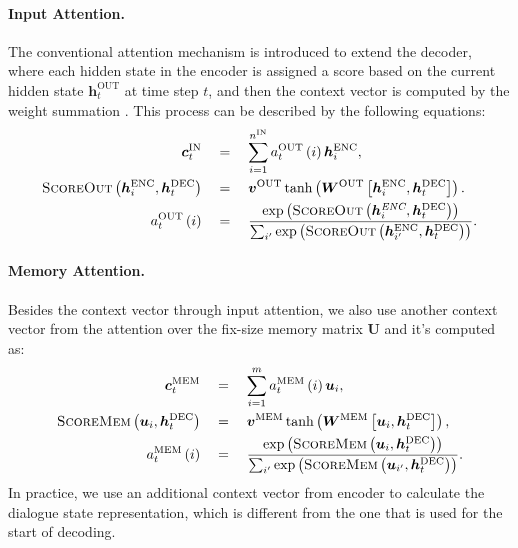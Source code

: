 \documentclass[11pt]{article}
\begin{document}
\paragraph{Input Attention.}
The conventional attention mechanism is introduced to extend the decoder, where each hidden state in the encoder is assigned a score based on the current hidden state $\boldsymbol h^{\text{OUT}}_t$ at time step $t$, and then the context vector is computed by the weight summation \cite{luong-pham-manning:2015:EMNLP}. This process can be described by the following equations:
\begin{align*}
\boldsymbol{c}^{\text{IN}}_t\quad &=\quad \sum_{i=1}^{n^{\text{IN}}}a^\text{OUT}_t\left(i\right)\boldsymbol h^{\text{ENC}}_i,\\
\textsc{ScoreOut}\left(\boldsymbol h^{\text{ENC}}_i, \boldsymbol h^{\text{DEC}}_t\right) \quad&=\quad \boldsymbol v^{\text{OUT}}\tanh\left(\boldsymbol W^{\text{OUT}}\left[\boldsymbol h^{\text{ENC}}_i, \boldsymbol h^{\text{DEC}}_t\right]\right).\\
a^\text{OUT}_t\left(i\right) \quad&=\quad \frac{\exp\left(\textsc{ScoreOut}\left(\boldsymbol h^{\textit{ENC}}_i, \boldsymbol h^{\text{DEC}}_t\right)\right)}{\sum_{i'}\exp\left(\textsc{ScoreOut}\left(\boldsymbol h^{\text{ENC}}_{i'}, \boldsymbol h^{\text{DEC}}_t\right)\right)}.\\
\end{align*}

\paragraph{Memory Attention.}
Besides the context vector through input attention, we also use another context vector from the attention over the fix-size memory matrix $\boldsymbol U$ and it's computed as:
\begin{align*}
\boldsymbol{c}^{\text{MEM}}_t \quad&=\quad \sum_{i=1}^{m}a^\text{MEM}_t\left(i\right)\boldsymbol u_i,\\
\textsc{ScoreMem}\left(\boldsymbol u_i, \boldsymbol h^{\text{DEC}}_t\right)\quad&=\quad \boldsymbol v^{\text{MEM}}\tanh\left(\boldsymbol W^{\text{MEM}}\left[\boldsymbol u_i, \boldsymbol h^{\text{DEC}}_t\right]\right),\\
a^{\text{MEM}}_t\left(i\right) \quad&=\quad \frac{\exp\left(\textsc{ScoreMem}\left(\boldsymbol u_i, \boldsymbol h^{\text{DEC}}_t\right)\right)}{\sum_{i'}\exp\left(\textsc{ScoreMem}\left(\boldsymbol u_{i'}, \boldsymbol h^{\text{DEC}}_t\right)\right)}.\\
\end{align*}
In practice, we use an additional context vector from encoder to calculate the dialogue state representation, which is different from the one that is used for the start of decoding.
\end{document}
